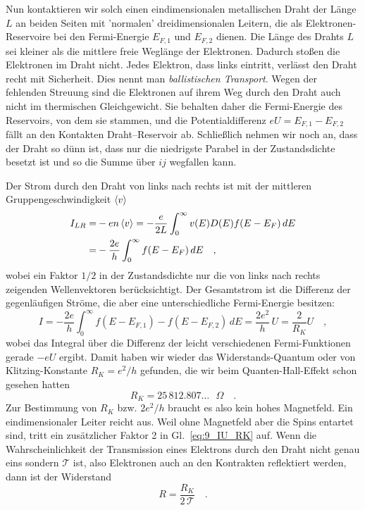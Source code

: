 Nun kontaktieren wir solch einen eindimensionalen metallischen Draht der Länge $L$ an beiden Seiten mit 'normalen' dreidimensionalen Leitern, die als Elektronen-Reservoire bei den Fermi-Energie $E_{F,1}$ und  $E_{F,2}$ dienen.  Die Länge des Drahts $L$ sei kleiner als die mittlere freie Weglänge der Elektronen. Dadurch stoßen die Elektronen im Draht nicht. Jedes Elektron, dass links eintritt, verlässt den Draht recht mit Sicherheit. Dies nennt man \emph{ballistischen Transport}. Wegen der fehlenden Streuung sind die Elektronen auf ihrem Weg durch den Draht auch nicht im thermischen Gleichgewicht. Sie behalten daher die Fermi-Energie des Reservoirs, von dem sie stammen, und die Potentialdifferenz $e U = E_{F,1} - E_{F,2}$ fällt an den Kontakten Draht--Reservoir ab. Schließlich nehmen wir noch an, dass der Draht so dünn ist, dass nur die niedrigste Parabel in der Zustandsdichte besetzt ist und so die Summe über $ij$ wegfallen kann.

Der Strom durch den Draht von links nach rechts ist  mit  der mittleren Gruppengeschwindigkeit $\braket{v}$
\begin{align}
    I_{LR} = & -e n \braket{v} = - \frac{e}{2 L} \int_0^\infty v(E) D(E) f(E - E_F) \, dE \\
    = & - \frac{2 e}{h} \int_0^\infty  f(E - E_F) \,  dE \quad ,
\end{align}
wobei ein Faktor $1/2$ in der Zustandsdichte nur die von links nach rechts zeigenden Wellenvektoren berücksichtigt.  Der Gesamtstrom ist die Differenz der gegenläufigen Ströme, die aber eine unterschiedliche Fermi-Energie besitzen:
\begin{equation}
    I = - \frac{2 e}{h} \int_0^\infty  f(E - E_{F,1}) -  f(E - E_{F,2}) \, dE =  \frac{2 e^2}{h} \, U = \frac{2}{R_K} U \quad ,
    \label{eq:9_IU_RK}
\end{equation}
wobei das Integral über die Differenz der leicht verschiedenen Fermi-Funktionen gerade $- e U$ ergibt. Damit haben wir wieder das Widerstands-Quantum oder von Klitzing-Konstante $R_K = e^2/h$ gefunden, die wir beim Quanten-Hall-Effekt schon gesehen hatten
\begin{equation}
    R_K = 25 \, 812.807\dots\text{ $\Omega$} \quad .
\end{equation}
Zur Bestimmung von $R_K$ bzw. $2e^2/h$ braucht es also kein hohes Magnetfeld. Ein eindimensionaler Leiter reicht aus. Weil ohne Magnetfeld aber die Spins entartet sind, tritt ein zusätzlicher Faktor 2 in Gl.~\ref{eq:9_IU_RK} auf. 
Wenn die Wahrscheinlichkeit der Transmission eines Elektrons durch den Draht nicht genau eins sondern $\mathcal{T}$ ist, also Elektronen auch an den Kontrakten reflektiert werden, dann ist der Widerstand
\begin{equation}
    R = \frac{R_K}{2 \, \mathcal{T}} \quad .
\end{equation}


